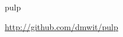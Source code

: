 \documentclass{scrreprt}
\begin{document}
\begin{hcarentry}{pulp}
%
%
%
%

\FurtherReading
  \url{http://github.com/dmwit/pulp}
\end{hcarentry}
\end{document}
